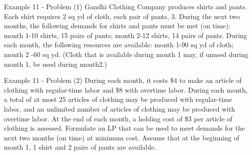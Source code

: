 \begin{frame}{Example 11 - Problem (1)}
Gandhi Clothing Company produces shirts and pants. Each shirt requires 2 sq yd
of cloth, each pair of pants, 3. During the next two months, the following
demands for shirts and pants must be met (on time): month 1-10 shirts, 15 pairs
of pants; month 2-12 shirts, 14 pairs of pants. During each month, the
following resources are available: month 1-90 sq yd of cloth; month 2 -60 sq yd.
(Cloth that is available during month 1 may, if unused during month 1, be used
during month2.)
\end{frame}

\begin{frame}{Example 11 - Problem (2)}
During each month, it costs \$4 to make an article of clothing with regular-time
labor and \$8 with overtime labor. During each month, a total of at most 25
articles of clothing may be produced with regular-time labor, and an unlimited
number of articles of clothing may be produced with overtime labor. At the end
of each month, a holding cost of \$3 per article of clothing is assessed.
Formulate an LP that can be used to meet demands for the next two months
(on time) at minimum cost. Assume that at the beginning of month 1, 1 shirt and
2 pairs of pants are available.
\end{frame}
